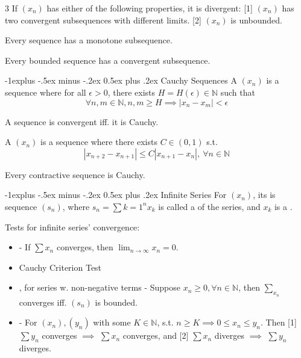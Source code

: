 \documentclass[10pt,landscape,letterpaper]{article}
\makeatletter
\renewcommand{\subsection}{\@startsection{subsection}{2}{0mm}%
                                {-1explus -.5ex minus -.2ex}%
                                {0.5ex plus .2ex}%
                                {\sffamily\normalsize\itshape}}
\makeatother
\begin{document}
\begin{multicols}{3}
 If $(x_n)$ has either of the following properties, it is divergent: [1] $(x_n)$ has two convergent subsequences with different limits. [2] $(x_n)$ is unbounded.


 Every sequence has a monotone subsequence.


 Every bounded sequence has a convergent subsequence.




\subsection{Cauchy Sequences}
A  $(x_n)$ is a sequence where for all $\epsilon > 0$, there exists $H = H(\epsilon) \in \mathbb{N}$ such that
\[
\forall n, m \in \mathbb{N}, n, m \ge H \implies |x_n - x_m| < \epsilon
\]

 A sequence is convergent iff. it is Cauchy.


\smallbreak


A  $(x_n)$ is a sequence where there exists $C \in (0, 1)$ s.t. 
\[
|x_{n+2} - x_{n+1}| \le C |x_{n+1} - x_n|, \ \forall n \in \mathbb{N}
\]


 Every contractive sequence is Cauchy.




\subsection{Infinite Series}
For $(x_n)$, its  is sequence $(s_n)$, where $s_n = \sum{k=1}^n x_k$ is called a  of the series, and $x_k$ is a .

Tests for infinite series' convergence:
\begin{itemize}
    \item {} - If $\sum x_n$ converges, then $\lim_{n\to\infty} x_n = 0$.
    
    \item Cauchy Criterion Test
    
    \item {}, for series w. non-negative terms - Suppose $x_n \ge 0, \forall n \in \mathbb{N}$, then $\sum_{x_n}$ converges iff. $(s_n)$ is bounded.
    
    \item {} - For $(x_n), (y_n)$ with some $K \in \mathbb{N}$, s.t. $n \ge K \implies 0 \le x_n \le y_n$. Then [1] $\sum y_n$ converges $\implies$ $\sum x_n$ converges, and [2] $\sum x_n$ diverges $\implies$ $\sum y_n$ diverges.
    

\end{itemize}
\end{multicols}
\end{document}
